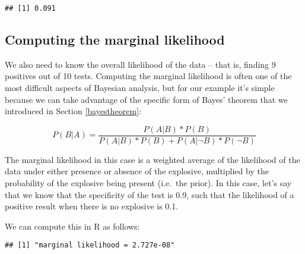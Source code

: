 \documentclass[]{book}
\newenvironment{Shaded}{\begin{snugshade}}{\end{snugshade}}
\newcommand{\KeywordTok}[1]{\textcolor[rgb]{0.13,0.29,0.53}{\textbf{#1}}}
\newcommand{\DataTypeTok}[1]{\textcolor[rgb]{0.13,0.29,0.53}{#1}}
\newcommand{\DecValTok}[1]{\textcolor[rgb]{0.00,0.00,0.81}{#1}}
\newcommand{\FloatTok}[1]{\textcolor[rgb]{0.00,0.00,0.81}{#1}}
\newcommand{\StringTok}[1]{\textcolor[rgb]{0.31,0.60,0.02}{#1}}
\newcommand{\OperatorTok}[1]{\textcolor[rgb]{0.81,0.36,0.00}{\textbf{#1}}}
\newcommand{\NormalTok}[1]{#1}
\theoremstyle{definition}
\theoremstyle{definition}
\theoremstyle{definition}
\theoremstyle{remark}
\begin{document}
\begin{verbatim}
## [1] 0.091
\end{verbatim}

\subsection{Computing the marginal
likelihood}\label{computing-the-marginal-likelihood}

We also need to know the overall likelihood of the data -- that is,
finding 9 positives out of 10 tests. Computing the marginal likelihood
is often one of the most difficult aspects of Bayesian analysis, but for
our example it's simple because we can take advantage of the specific
form of Bayes' theorem that we introduced in Section \ref{bayestheorem}:

\[
P(B|A) = \frac{P(A|B)*P(B)}{P(A|B)*P(B) + P(A|\neg B)*P(\neg B)}
\]

The marginal likelihood in this case is a weighted average of the
likelihood of the data under either presence or absence of the
explosive, multiplied by the probability of the explosive being present
(i.e.~the prior). In this case, let's say that we know that the
specificity of the test is 0.9, such that the likelihood of a positive
result when there is no explosive is 0.1.

We can compute this in R as follows:

\begin{Shaded}
\end{Shaded}

\begin{verbatim}
## [1] "marginal likelihood = 2.727e-08"
\end{verbatim}
\end{document}
